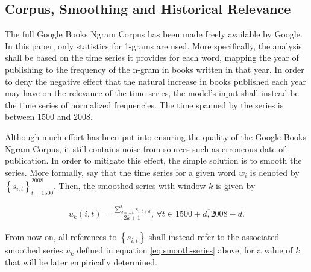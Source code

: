 
\subsection{Corpus, Smoothing and Historical Relevance}

The full Google Books Ngram Corpus has been made freely available by Google. In this paper, only statistics for 1-grams are used. More specifically, the analysis shall be based on the time series it provides for each word, mapping the year of publishing to the frequency of the n-gram in books written in that year. In order to deny the negative effect that the natural increase in books published each year may have on the relevance of the time series, the model's input shall instead be the time series of normalized frequencies. The time spanned by the series is between $1500$ and $2008$.

Although much effort has been put into ensuring the quality of the Google Books Ngram Corpus, it still contains noise from sources such as erroneous date of publication. In order to mitigate this effect, the simple solution is to smooth the series. More formally, say that the time series for a given word $w_i$ is denoted by $\left\{ s_{i, t} \right\}_{t = 1500}^{2008}$. Then, the smoothed series with window $k$ is given by

\begin{align}
\label{eq:smooth-series}
u_{k} \left( i, t \right) = \frac{\sum_{d = -k}^{k} s_{i, t + d}}{2k + 1}, \, \forall t \in \overline{1500 + d, 2008 - d}.
\end{align}

From now on, all references to $\left\{ s_{i, t} \right\}$ shall instead refer to the associated smoothed series $u_k$ defined in equation \eqref{eq:smooth-series} above, for a value of $k$ that will be later empirically determined.

